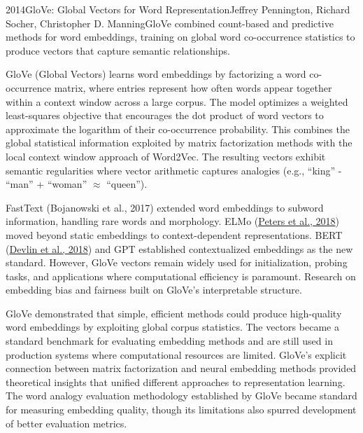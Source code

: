 
\begin{papersummary}{2014}{GloVe: Global Vectors for Word Representation}{Jeffrey Pennington, Richard Socher, Christopher D. Manning}{GloVe combined count-based and predictive methods for word embeddings, training on global word co-occurrence statistics to produce vectors that capture semantic relationships.}

GloVe (Global Vectors) learns word embeddings by factorizing a word co-occurrence matrix, where entries represent how often words appear together within a context window across a large corpus. The model optimizes a weighted least-squares objective that encourages the dot product of word vectors to approximate the logarithm of their co-occurrence probability. This combines the global statistical information exploited by matrix factorization methods with the local context window approach of Word2Vec. The resulting vectors exhibit semantic regularities where vector arithmetic captures analogies (e.g., ``king'' - ``man'' + ``woman'' $\approx$ ``queen'').

FastText (Bojanowski et al., 2017) extended word embeddings to subword information, handling rare words and morphology. ELMo (\hyperref[paper:peters-2018]{Peters et al., 2018}) moved beyond static embeddings to context-dependent representations. BERT (\hyperref[paper:devlin-2018]{Devlin et al., 2018}) and GPT established contextualized embeddings as the new standard. However, GloVe vectors remain widely used for initialization, probing tasks, and applications where computational efficiency is paramount. Research on embedding bias and fairness built on GloVe's interpretable structure.

GloVe demonstrated that simple, efficient methods could produce high-quality word embeddings by exploiting global corpus statistics. The vectors became a standard benchmark for evaluating embedding methods and are still used in production systems where computational resources are limited. GloVe's explicit connection between matrix factorization and neural embedding methods provided theoretical insights that unified different approaches to representation learning. The word analogy evaluation methodology established by GloVe became standard for measuring embedding quality, though its limitations also spurred development of better evaluation metrics.

\end{papersummary}
